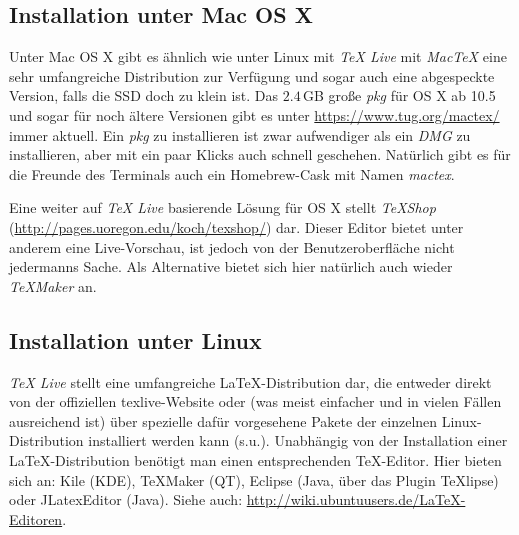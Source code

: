 \subsection{Installation unter Mac OS X}
Unter Mac OS X gibt es ähnlich wie unter Linux mit \textit{TeX Live} mit \textit{MacTeX} eine sehr umfangreiche Distribution zur Verfügung und sogar auch eine abgespeckte Version, falls die SSD doch zu klein ist. Das $2.4$\,GB große \textit{pkg} für OS X ab 10.5 und sogar für noch ältere Versionen gibt es unter \url{https://www.tug.org/mactex/} immer aktuell. Ein \textit{pkg} zu installieren ist zwar aufwendiger als ein \textit{DMG} zu installieren, aber mit ein paar Klicks auch schnell geschehen. Natürlich gibt es für die Freunde des Terminals auch ein Homebrew-Cask mit Namen \textit{mactex}.

Eine weiter auf \textit{TeX Live} basierende Lösung für OS X stellt \textit{TeXShop} (\url{http://pages.uoregon.edu/koch/texshop/}) dar. Dieser Editor bietet unter anderem eine Live-Vorschau, ist jedoch von der Benutzeroberfläche nicht jedermanns Sache. 
Als Alternative bietet sich hier natürlich auch wieder \textit{TeXMaker} an.

\subsection{Installation unter Linux}
\textit{TeX Live} stellt eine umfangreiche LaTeX-Distribution dar, die entweder direkt von der offiziellen texlive-Website oder (was meist einfacher und in vielen Fällen ausreichend ist) über spezielle dafür vorgesehene Pakete der einzelnen Linux-Distribution installiert werden kann (s.u.). Unabhängig von der Installation einer LaTeX-Distribution benötigt man einen entsprechenden TeX-Editor. Hier bieten sich an: Kile (KDE), TeXMaker (QT), Eclipse (Java, über das Plugin TeXlipse) oder JLatexEditor (Java). Siehe auch: \url{http://wiki.ubuntuusers.de/LaTeX-Editoren}.

